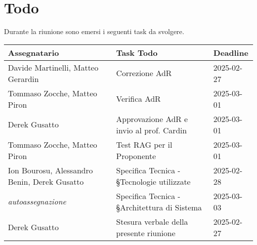 \section{Todo}
Durante la riunione sono emersi i seguenti task da svolgere.

\begin{center}
  \begin{tabular}{|L{4cm}|L{6cm}|L{3cm}|}
    \hline
    \textbf{Assegnatario} & \textbf{Task Todo} & \textbf{Deadline} \\ \hline
    Davide Martinelli, Matteo Gerardin &  Correzione AdR &  2025-02-27 \\ \hline
    Tommaso Zocche, Matteo Piron &  Verifica AdR &  2025-03-01 \\ \hline
    Derek Gusatto &  Approvazione AdR e invio al prof. Cardin &  2025-03-01 \\ \hline
    Tommaso Zocche, Matteo Piron &  Test RAG per il Proponente &  2025-03-01 \\ \hline
    Ion Bourosu, Alessandro Benin, Derek Gusatto &  Specifica Tecnica - §Tecnologie utilizzate &  2025-02-28\\ \hline
    \textit{autoassegnazione} &  Specifica Tecnica - §Architettura di Sistema &  2025-03-03 \\ \hline
    Derek Gusatto &  Stesura verbale della presente riunione &  2025-02-27 \\ \hline
  \end{tabular}
\end{center}